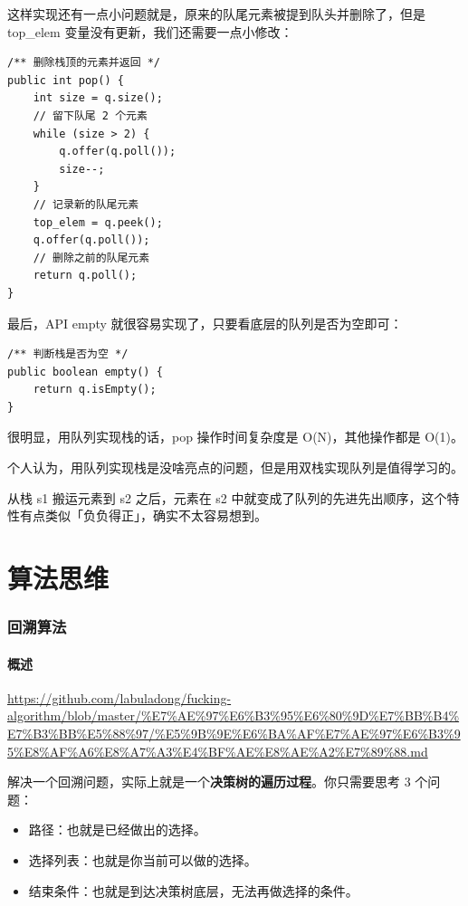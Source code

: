 \documentclass[12pt]{article}
\begin{document}
这样实现还有一点小问题就是，原来的队尾元素被提到队头并删除了，但是 top\_elem 变量没有更新，我们还需要一点小修改：
\begin{lstlisting}
/** 删除栈顶的元素并返回 */
public int pop() {
    int size = q.size();
    // 留下队尾 2 个元素
    while (size > 2) {
        q.offer(q.poll());
        size--;
    }
    // 记录新的队尾元素
    top_elem = q.peek();
    q.offer(q.poll());
    // 删除之前的队尾元素
    return q.poll();
}
\end{lstlisting}

最后，API empty 就很容易实现了，只要看底层的队列是否为空即可：
\begin{lstlisting}
/** 判断栈是否为空 */
public boolean empty() {
    return q.isEmpty();
}
\end{lstlisting}

很明显，用队列实现栈的话，pop 操作时间复杂度是 O(N)，其他操作都是 O(1)​。​

个人认为，用队列实现栈是没啥亮点的问题，但是用双栈实现队列是值得学习的。

从栈 s1 搬运元素到 s2 之后，元素在 s2 中就变成了队列的先进先出顺序，这个特性有点类似「负负得正」，确实不太容易想到。

\part{算法思维}
\section{回溯算法}
\subsection{概述}
\url{https://github.com/labuladong/fucking-algorithm/blob/master/%E7%AE%97%E6%B3%95%E6%80%9D%E7%BB%B4%E7%B3%BB%E5%88%97/%E5%9B%9E%E6%BA%AF%E7%AE%97%E6%B3%95%E8%AF%A6%E8%A7%A3%E4%BF%AE%E8%AE%A2%E7%89%88.md}

解决一个回溯问题，实际上就是一个\textbf{决策树的遍历过程}。你只需要思考 3 个问题：
\begin{itemize}
\setlength{\itemsep}{0pt}
\setlength{\parsep}{0pt}
\setlength{\parskip}{0pt}
    \item 路径：也就是已经做出的选择。
    \item 选择列表：也就是你当前可以做的选择。
    \item 结束条件：也就是到达决策树底层，无法再做选择的条件。
\end{itemize}
\end{document}
